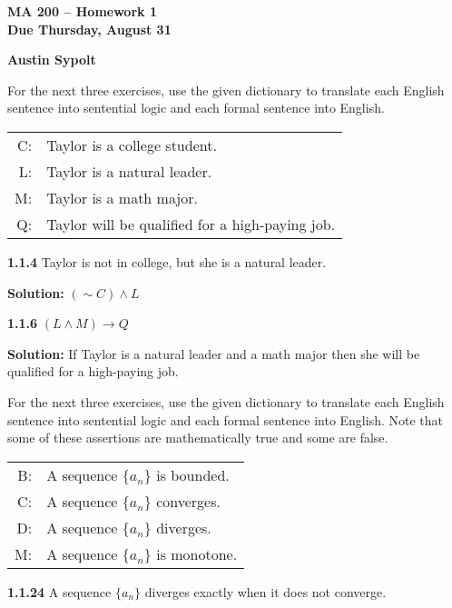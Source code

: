 \documentclass[12pt]{article}
\begin{document}
\begin{center}
\large{\textbf{MA 200 -- Homework 1\\ Due Thursday, August 31 }}

\large{\textbf{Austin Sypolt}}
\end{center}

\vspace{12pt}

For the next three exercises, use the given dictionary to translate each English sentence into sentential logic and each formal sentence into English.
\begin{center}
\begin{tabular}{rl}
C:&Taylor is a college student.\\
L:&Taylor is a natural leader.\\
M:&Taylor is a math major.\\
Q:&Taylor will be qualified for a high-paying job.
\end{tabular}
\end{center}
\noindent\textbf{1.1.4} Taylor is not in college, but she is a natural leader.

\doublespacing
\textbf{Solution:} $(\sim C)\wedge L$

\singlespacing
\vspace{12pt}

\noindent\textbf{1.1.6} $(L\wedge M)\rightarrow Q$

\doublespacing
\textbf{Solution:} If Taylor is a natural leader and a math major then she will be qualified for a high-paying job.


\singlespacing
\vspace{12pt}
\newpage

For the next three exercises, use the given dictionary to translate each English sentence into sentential logic and each formal sentence into English. Note that some of these assertions are mathematically true and some are false.
\begin{center}
\begin{tabular}{rl}
B:&A sequence $\{a_n\}$ is bounded.\\
C:&A sequence $\{a_n\}$ converges.\\
D:&A sequence $\{a_n\}$ diverges.\\
M:&A sequence $\{a_n\}$ is monotone.\\
\end{tabular}
\end{center}
\noindent\textbf{1.1.24} A sequence $\{a_n\}$ diverges exactly when  it does not converge.
\end{document}

